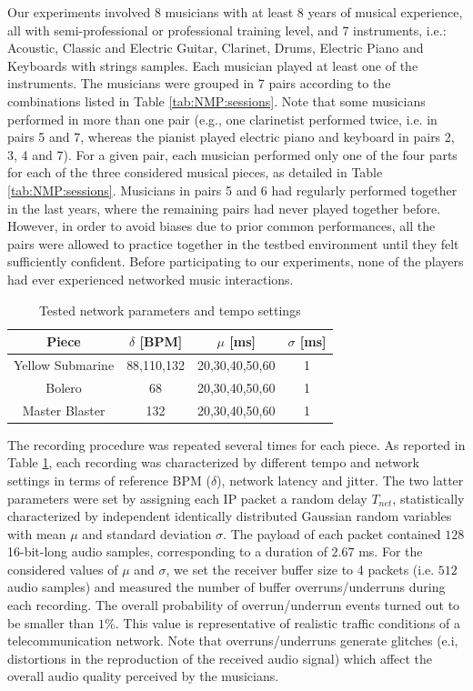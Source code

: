 Our experiments involved 8 musicians with at least 8 years of musical experience, all with semi-professional or professional training level, and 7 instruments, i.e.:
Acoustic, Classic and Electric Guitar, Clarinet, Drums, Electric Piano and Keyboards with strings samples. Each musician played at least one of the instruments. The musicians were grouped in 7 pairs according to the combinations listed in Table \ref{tab:NMP:sessions}. Note that some musicians performed in more than one pair (e.g., one clarinetist performed twice, i.e. in pairs 5 and 7, whereas the pianist played electric piano and keyboard in pairs 2, 3, 4 and 7). For a given pair, each musician performed only one of the four parts for each of the three considered musical pieces, as detailed in Table \ref{tab:NMP:sessions}. Musicians in pairs 5 and 6 had regularly performed together in the last years, where the remaining pairs had never played together before. However, in order to avoid biases due to prior common performances, all the pairs were allowed to practice together in the testbed environment until they felt sufficiently confident. Before participating to our experiments, none of the players had ever experienced networked music interactions.

\begin{table}[tb]
  \caption{Tested network parameters and tempo settings}
  \centering %
  \label{tab:NMP:param}  
  \bgroup
  \def\arraystretch{1.5}
  \begin{tabular}{||c|c|c|c||}
\hline
\hline
 Piece & $\delta$ [BPM]& $\mu$ [ms]& $\sigma$ [ms]\\
\hline
\hline
 Yellow Submarine & 88,110,132 & 20,30,40,50,60 & 1 \\
 Bolero & 68  & 20,30,40,50,60 & 1 \\
 Master Blaster & 132  & 20,30,40,50,60 & 1 \\
\hline
\hline
  \end{tabular}
  \egroup
\end{table}

The recording procedure was repeated several times for each piece. As reported in Table \ref{tab:NMP:param}, each recording was characterized by different tempo and network settings in terms of reference BPM ($\delta$), network latency and jitter. The two latter parameters were set by assigning each IP packet a random delay $T_{net}$, statistically characterized by independent identically distributed Gaussian random variables with mean $\mu$ and standard deviation $\sigma$. The payload of each packet contained $128$ 16-bit-long audio samples, corresponding to a duration of $2.67$ ms. For the considered values of $\mu$ and $\sigma$, we set the receiver buffer size to 4 packets (i.e. $512$ audio samples) and measured the number of buffer overruns/underruns during each recording. The overall probability of overrun/underrun events turned out to be smaller than $1\%$. This value is representative of realistic traffic conditions of a telecommunication network. Note that overruns/underruns generate glitches (e.i, distortions in the reproduction of the received audio signal) which affect the overall audio quality perceived by the musicians. 
 

